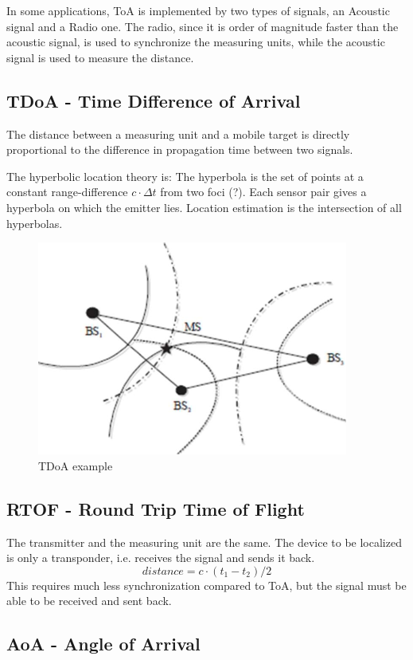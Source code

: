 In some applications, ToA is implemented by two types of signals, an Acoustic signal and a Radio one.
The radio, since it is order of magnitude faster than the acoustic signal, is used to synchronize the measuring units, while the acoustic signal is used to measure the distance.

\subsection{TDoA - Time Difference of Arrival}
The distance between a measuring unit and a mobile target is directly proportional to the difference in propagation time between two signals.

The hyperbolic location theory is:
The hyperbola is the set of points at a constant range-difference $c\cdot\Delta t$ from two foci (?).
Each sensor pair gives a hyperbola on which the emitter lies.
Location estimation is the intersection of all hyperbolas.

\begin{figure}[htbp]
   \centering
   \includegraphics{images/tdoa.png}
   \caption{TDoA example}
   \label{fig:tdoa}
\end{figure}

\subsection{RTOF - Round Trip Time of Flight}
The transmitter and the measuring unit are the same. The device to be localized is only a transponder, i.e. receives the signal and sends it back.
\[
   distance = c\cdot(t_1 - t_2)/2
\]
This requires much less synchronization compared to ToA, but the signal must be able to be received and sent back.

\subsection{AoA - Angle of Arrival}

